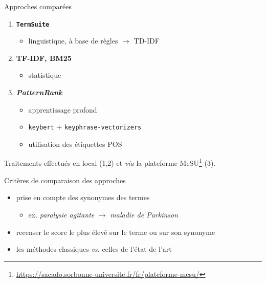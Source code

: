 \documentclass[xcolor={table,usenames,dvipsnames}]{beamer}
\let\olditem\item
\renewcommand{\item}{%
\olditem\vspace{0pt}}
\begin{document}
\begin{frame}{Approches comparées}
	\begin{enumerate}
		\item \textcolor{deepblue}{\textbf{\texttt{TermSuite}}} \citep{cram2016terminology}
		\begin{itemize}
			\item linguistique, à base de règles $\rightarrow$ TD-IDF
		\end{itemize} 
		\item \textcolor{deepblue}{\textbf{TF-IDF, BM25}} \citep{robertson1976relevance}  
		\begin{itemize}
			\item statistique
		\end{itemize}
		\item \textcolor{deepblue}{\textbf{\textit{PatternRank}}} \citep{schopf2022}
		\begin{itemize}
			\item apprentissage profond
			\item \texttt{keybert} + \texttt{keyphrase-vectorizers}
			\item utilisation des étiquettes POS
		\end{itemize} 
	\end{enumerate}
	
	\begin{block}{\vspace*{-0.6mm}}
			Traitements effectués en local (1,2) et \textit{via} la plateforme MeSU\footnote{\url{https://sacado.sorbonne-universite.fr/fr/plateforme-mesu/}} (3).
	\end{block}

\end{frame}

\begin{frame}{Critères de comparaison des approches}
	\begin{itemize}
		\item prise en compte des synonymes des termes
		\begin{itemize}
			\item ex. \textit{paralysie agitante} $\rightarrow$ \textit{maladie de Parkinson} 
		\end{itemize}
					\item recenser le score le plus élevé sur le terme ou sur son synonyme
					\item les méthodes classiques \textit{vs.} celles de l'état de l'art
	\end{itemize}
	
	\end{frame}
	
\end{document}
